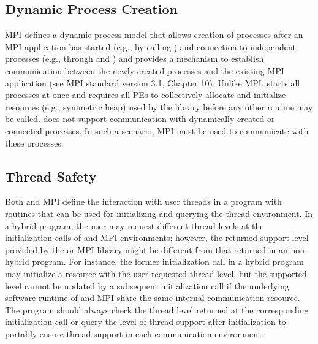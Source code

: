 

\subsection{Dynamic Process Creation}
\label{subsec:interoperability:mpmd}

MPI defines a dynamic process model that allows creation of processes after
an MPI application has started (e.g., by calling ) and
connection to independent processes (e.g., through 
and )
and provides a mechanism to establish communication
between the newly created processes and the existing MPI application (see
MPI standard version 3.1, Chapter 10).
Unlike MPI, \openshmem starts all processes at once and requires all PEs to
collectively allocate and initialize resources (e.g., symmetric heap) used by
the \openshmem library before any other \openshmem routine may
be called. \openshmem does not support communication with dynamically created
or connected processes. In such a scenario, MPI must be used to communicate
with these processes.


\subsection{Thread Safety}
\label{subsec:interoperability:thread}
Both \openshmem and MPI define the interaction with user threads in a program
with routines that can be used for initializing and querying the thread
environment. In a hybrid program, the user may request different thread levels
at the initialization calls of \openshmem and MPI environments; however, the
returned support level provided by the \openshmem or MPI library might be different
from that returned in an non-hybrid program. For instance, the former
initialization call in a hybrid program may initialize a resource with the
user-requested thread level, but the supported level cannot be updated by a subsequent
initialization call if the underlying software runtime of \openshmem and MPI
share the same internal communication resource.
The program should always check the  thread level returned
at the corresponding initialization call or query the level of thread support
after initialization to portably ensure thread support in each communication
environment.

